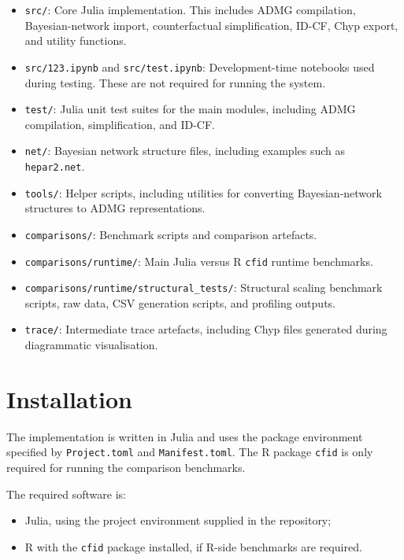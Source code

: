 \documentclass[a4paper]{report}
\begin{document}
\begin{itemize}
    \item \texttt{src/}: Core Julia implementation. This includes ADMG compilation, Bayesian-network import, counterfactual simplification, ID-CF, Chyp export, and utility functions.
    \item \texttt{src/123.ipynb} and \texttt{src/test.ipynb}: Development-time notebooks used during testing. These are not required for running the system.
    \item \texttt{test/}: Julia unit test suites for the main modules, including ADMG compilation, simplification, and ID-CF.
    \item \texttt{net/}: Bayesian network structure files, including examples such as \texttt{hepar2.net}.
    \item \texttt{tools/}: Helper scripts, including utilities for converting Bayesian-network structures to ADMG representations.
    \item \texttt{comparisons/}: Benchmark scripts and comparison artefacts.
    \item \texttt{comparisons/runtime/}: Main Julia versus R \texttt{cfid} runtime benchmarks.
    \item \texttt{comparisons/runtime/structural\_tests/}: Structural scaling benchmark scripts, raw data, CSV generation scripts, and profiling outputs.
    \item \texttt{trace/}: Intermediate trace artefacts, including Chyp files generated during diagrammatic visualisation.
\end{itemize}

\section{Installation}

The implementation is written in Julia and uses the package environment specified by \texttt{Project.toml} and \texttt{Manifest.toml}. 
The R package \texttt{cfid} is only required for running the comparison benchmarks.

The required software is:

\begin{itemize}
    \item Julia, using the project environment supplied in the repository;
    \item R with the \texttt{cfid} package installed, if R-side benchmarks are required.
\end{itemize}
\end{document}
